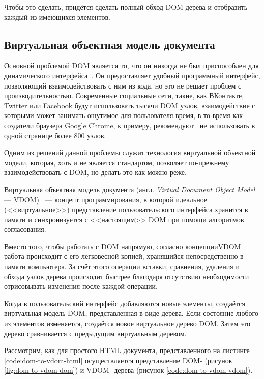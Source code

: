 Чтобы это сделать, придётся сделать полный обход DOM-дерева и отобразить каждый из имеющихся элементов.

\subsection{Виртуальная объектная модель документа}

Основной проблемой DOM является то, что он никогда не был приспособлен для динамического интерфейса~\cite{not-dynamic}.
Он предоставляет удобный программный интерфейс, позволяющий взаимодействовать с ним из кода, но это не решает проблем с производительностью.
Современные социальные сети, такие, как ВКонтакте, Twitter или Facebook будут использовать тысячи DOM узлов, взаимодействие с которыми может занимать ощутимое для пользователя время, в то время как создатели браузера Google Chrome, к примеру, рекомендуют~\cite{dom-max} не использовать в одной странице более 800 узлов.

Одним из решений данной проблемы служит технология виртуальной объектной модели, которая, хоть  и не является стандартом, позволяет по-прежнему взаимодействовать с DOM, но делать это как можно реже.

Виртуальная объектная модель документа (англ. \textit{Virtual Document Object Model} --- VDOM)~\cite{vdom} ---  концепт программирования, в которой идеальное (<<виртуальное>>) представление пользовательского интерфейса хранится в памяти и синхронизуется с <<настоящим>> DOM при помощи алгоритмов согласования.

Вместо того, чтобы работать с DOM напрямую, согласно концепции\break VDOM работа происходит с его легковесной копией, хранящийся непосредственно в памяти компьютера.
За счёт этого операции вставки, сравнения, удаления и обхода узлов дерева происходит быстрее благодаря отсутствию необходимости отрисовывать изменения после каждой операции.

Когда в пользовательский интерфейс добавляются новые элементы, создаётся виртуальная модель DOM, представленная в виде дерева.
Если состояние любого из элементов изменяется, создаётся новое виртуальное дерево DOM.
Затем это дерево сравнивается с предыдущим виртуальным деревом.


Рассмотрим, как для простого  HTML документа, представленного на листинге \ref{code:dom-to-vdom-html} осуществляется представление DOM- (рисунок \ref{fig:dom-to-vdom-dom}) и VDOM- дерева (рисунок \ref{code:dom-to-vdom-vdom}).


